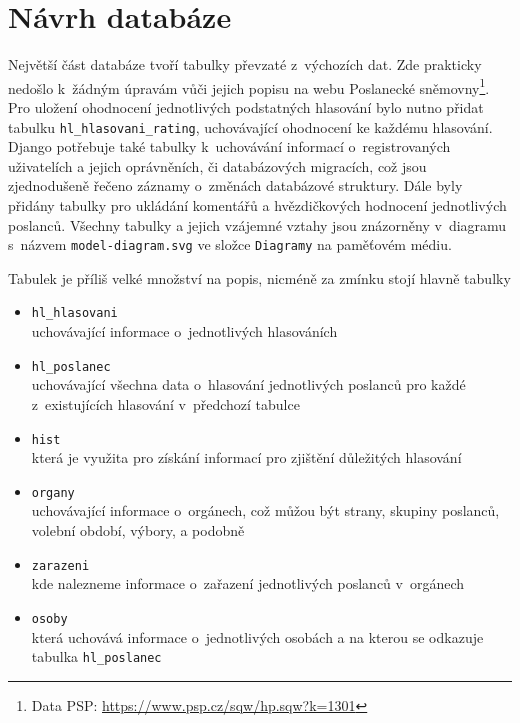\section{Návrh databáze}
Největší část databáze tvoří tabulky převzaté z~výchozích dat. Zde prakticky nedošlo k~žádným úpravám vůči jejich popisu na webu Poslanecké sněmovny\footnote{Data PSP: \url{https://www.psp.cz/sqw/hp.sqw?k=1301}}. Pro uložení ohodnocení jednotlivých podstatných hlasování bylo nutno přidat tabulku \texttt{hl\_hlasovani\_rating}, uchovávající ohodnocení ke každému hlasování. Django potřebuje také tabulky k~uchovávání informací o~registrovaných uživatelích a jejich oprávněních, či databázových migracích, což jsou zjednodušeně řečeno záznamy o~změnách databázové struktury. Dále byly přidány tabulky pro ukládání komentářů a hvězdičkových hodnocení jednotlivých poslanců. Všechny tabulky a jejich vzájemné vztahy jsou znázorněny v~diagramu s~názvem \texttt{model-diagram.svg} ve složce \texttt{Diagramy} na paměťovém médiu.

\par Tabulek je příliš velké množství na popis, nicméně za zmínku stojí hlavně tabulky 

\begin{itemize}
    \item \texttt{hl\_hlasovani} \\
    uchovávající informace o~jednotlivých hlasováních
    \item \texttt{hl\_poslanec}\\ 
    uchovávající všechna data o~hlasování jednotlivých poslanců pro každé z~existujících hlasování v~předchozí tabulce
    \item \texttt{hist}\\ 
    která je využita pro získání informací pro zjištění důležitých hlasování
    \item \texttt{organy} \\
    uchovávající informace o~orgánech, což můžou být strany, skupiny poslanců, volební období, výbory, a podobně
    \item \texttt{zarazeni}\\ 
    kde nalezneme  informace o~zařazení jednotlivých poslanců v~orgánech
    \item \texttt{osoby}\\ 
    která uchovává informace o~jednotlivých osobách a na kterou se odkazuje tabulka \texttt{hl\_poslanec}
\end{itemize}

